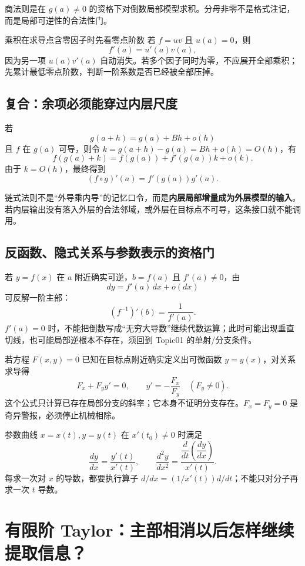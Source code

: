 \documentclass[11pt,a4paper]{ctexart}
\begin{document}
商法则是在 $g(a)\ne0$ 的资格下对倒数局部模型求积。分母非零不是格式注记，而是局部可逆性的合法性门。

\begin{methodbox}{乘积在求导点含零因子时先看零点阶数}
若 $f=uv$ 且 $u(a)=0$，则
\[
f'(a)=u'(a)v(a),
\]
因为另一项 $u(a)v'(a)$ 自动消失。若多个因子同时为零，不应展开全部乘积；先累计最低零点阶数，判断一阶系数是否已经被全部压掉。
\end{methodbox}

\subsection{复合：余项必须能穿过内层尺度}

若
\[
g(a+h)=g(a)+Bh+o(h)
\]
且 $f$ 在 $g(a)$ 可导，则令 $k=g(a+h)-g(a)=Bh+o(h)=O(h)$，有
\[
f(g(a)+k)=f(g(a))+f'(g(a))k+o(k).
\]
由于 $k=O(h)$，最终得到
\[
(f\circ g)'(a)=f'(g(a))g'(a).
\]

链式法则不是“外导乘内导”的记忆口令，而是\textbf{内层局部增量成为外层模型的输入}。若内层输出没有落入外层的合法邻域，或外层在目标点不可导，这条接口就不能调用。

\subsection{反函数、隐式关系与参数表示的资格门}

若 $y=f(x)$ 在 $a$ 附近确实可逆，$b=f(a)$ 且 $f'(a)\ne0$，由
\[
dy=f'(a)\,dx+o(dx)
\]
可反解一阶主部：
\[
(f^{-1})'(b)=\frac1{f'(a)}.
\]
$f'(a)=0$ 时，不能把倒数写成“无穷大导数”继续代数运算；此时可能出现垂直切线，也可能局部逆根本不存在，须回到 Topic01 的单射/分支条件。

若方程 $F(x,y)=0$ 已知在目标点附近确实定义出可微函数 $y=y(x)$，对关系求导得
\[
F_x+F_y y'=0,
\qquad
y'=-\frac{F_x}{F_y}\quad(F_y\ne0).
\]
这个公式只计算已存在局部分支的斜率；它本身不证明分支存在。$F_x=F_y=0$ 是奇异警报，必须停止机械相除。

参数曲线 $x=x(t),y=y(t)$ 在 $x'(t_0)\ne0$ 时满足
\[
\frac{dy}{dx}=\frac{y'(t)}{x'(t)},
\qquad
\frac{d^2y}{dx^2}
=\frac{\dfrac{d}{dt}\left(\dfrac{dy}{dx}\right)}{x'(t)}.
\]
每求一次对 $x$ 的导数，都要执行算子 $d/dx=(1/x'(t))d/dt$；不能只对分子再求一次 $t$ 导数。

\section{有限阶 Taylor：主部相消以后怎样继续提取信息？}
\end{document}
